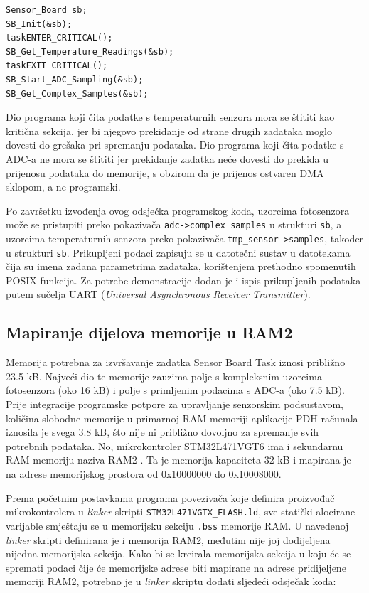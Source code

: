 \begin{lstlisting}
Sensor_Board sb;
SB_Init(&sb);
taskENTER_CRITICAL();
SB_Get_Temperature_Readings(&sb);
taskEXIT_CRITICAL();
SB_Start_ADC_Sampling(&sb);
SB_Get_Complex_Samples(&sb);
\end{lstlisting}

Dio programa koji čita podatke s temperaturnih senzora mora se štititi kao kritična sekcija, jer bi njegovo prekidanje od strane drugih zadataka moglo dovesti do grešaka pri spremanju podataka. Dio programa koji čita podatke s ADC-a ne mora se štititi jer prekidanje zadatka neće dovesti do prekida u prijenosu podataka do memorije, s obzirom da je prijenos ostvaren DMA sklopom, a ne programski.

Po završetku izvođenja ovog odsječka programskog koda, uzorcima fotosenzora može se pristupiti preko pokazivača \texttt{adc->complex\_samples} u strukturi \texttt{sb}, a uzorcima temperaturnih senzora preko pokazivača \texttt{tmp\_sensor->samples}, također u strukturi \texttt{sb}. Prikupljeni podaci zapisuju se u datotečni sustav u datotekama čija su imena zadana parametrima zadataka, korištenjem prethodno spomenutih POSIX funkcija. Za potrebe demonstracije dodan je i ispis prikupljenih podataka putem sučelja UART (\textit{Universal Asynchronous Receiver Transmitter}).

\subsection{Mapiranje dijelova memorije u RAM2}

Memorija potrebna za izvršavanje zadatka Sensor Board Task iznosi približno 23.5 kB. Najveći dio te memorije zauzima polje s kompleksnim uzorcima fotosenzora (oko 16 kB) i polje s primljenim podacima s ADC-a (oko 7.5 kB). Prije integracije programske potpore za upravljanje senzorskim podsustavom, količina slobodne memorije u primarnoj RAM memoriji aplikacije PDH računala iznosila je svega 3.8 kB, što nije ni približno dovoljno za spremanje svih potrebnih podataka. No, mikrokontroler STM32L471VGT6 ima i sekundarnu RAM memoriju naziva RAM2 \cite{stm32l4_manual}. Ta je memorija kapaciteta 32 kB i mapirana je na adrese memorijskog prostora od 0x10000000 do 0x10008000.

Prema početnim postavkama programa povezivača  koje definira proizvođač mikrokontrolera u \textit{linker} skripti \texttt{STM32L471VGTX\_FLASH.ld}, sve statički alocirane varijable smještaju se u memorijsku sekciju \texttt{.bss} memorije RAM. U navedenoj \textit{linker} skripti definirana je i memorija RAM2, međutim nije joj dodijeljena nijedna memorijska sekcija. Kako bi se kreirala memorijska sekcija u koju će se spremati podaci čije će memorijske adrese biti mapirane na adrese pridijeljene memoriji RAM2, potrebno je u \textit{linker} skriptu dodati sljedeći odsječak koda:

